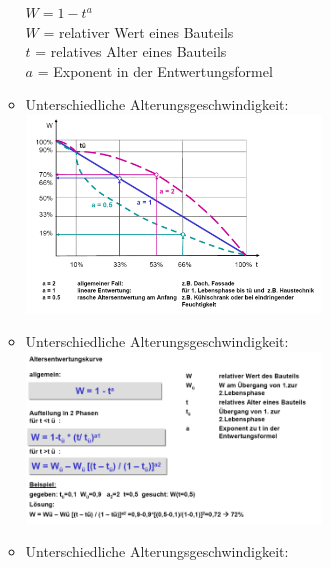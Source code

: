 \documentclass[fleqn,twoside,dvipsnames]{article}
\begin{document}
\begin{itemize}
\begin{itemize}
\begin{minipage}{0.4\textwidth}
                        \end{minipage}
                        \begin{minipage}{0.55\textwidth}
                            $W = 1-t^a$\\
                            $W$ = relativer Wert eines Bauteils\\
                            $t$ = relatives Alter eines Bauteils\\
                            $a$ = Exponent in der Entwertungsformel
                        \end{minipage}
                    \item Unterschiedliche Alterungsgeschwindigkeit:\\
                        \includegraphics[width=0.65\textwidth]{Grafiken/Verfahren zur Bestimmung von Bauteillebensdauern/Wertverlustkurven - Wertverlust nach Schroeder untersch. Alt.GEschw..png}
                    \item Unterschiedliche Alterungsgeschwindigkeit:\\
                        \includegraphics[width=0.65\textwidth]{Grafiken/Verfahren zur Bestimmung von Bauteillebensdauern/Wertverlustkurven - Wertverlust nach Schroeder allg. Formel.png}
                    \item Unterschiedliche Alterungsgeschwindigkeit:\\

\end{itemize}
\end{itemize}
\end{document}
